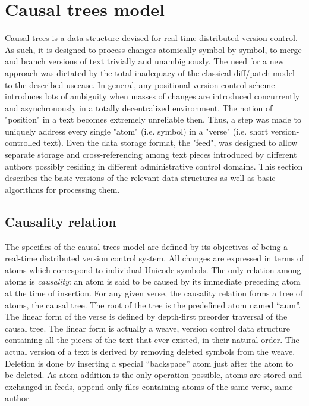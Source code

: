 \documentclass[twocolumn]{article}
\begin{document}
\section {Causal trees model}

   Causal trees is a data structure devised for real-time distributed
   version control. As such, it is designed to process changes
   atomically symbol by symbol, to merge and branch versions of text
   trivially and unambiguously. The need for a new approach was
   dictated by the total inadequacy of the classical diff/patch model
   to the described usecase. In general, any positional version
   control scheme introduces lots of ambiguity when masses of changes
   are introduced concurrently and asynchronously in a totally
   decentralized environment. The notion of "position" in a text
   becomes extremely unreliable then. Thus, a step was made to
   uniquely address every single "atom" (i.e. symbol) in a "verse"
   (i.e. short version-controlled text). Even the data storage format,
   the "feed", was designed to allow separate storage and
   cross-referencing among text pieces introduced by different authors
   possibly residing in different administrative control domains. This
   section describes the basic versions of the relevant data
   structures as well as basic algorithms for processing them.
   
\subsection{Causality relation}   
   
   The specifics of the causal trees model are defined by its
   objectives of being a real-time distributed version control system.
   All changes are expressed in terms of atoms which correspond to
   individual Unicode symbols. The only relation among atoms is
   \emph{causality}: an atom is said to be caused by its immediate preceding
   atom at the time of insertion. For any given verse, the causality
   relation forms a tree of atoms, the causal tree.
   The root of the tree is the predefined atom named ``aum''.
   The linear form of the verse is defined by depth-first preorder
   traversal of the causal tree. The linear form is actually a weave,
   version control data structure containing all the pieces of the
   text that ever existed, in their natural order. The actual version
   of a text is derived by removing deleted symbols from the weave.
   Deletion is done by inserting a special ``backspace'' atom just
   after the atom to be deleted. 
   As atom addition is
   the only operation possible, atoms are stored and exchanged in
   feeds, append-only files containing atoms of the same verse, same
   author.
   
\end{document}
